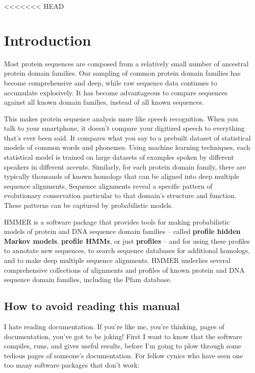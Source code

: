 <<<<<<< HEAD
\newpage
\chapter{Introduction}
\label{chapter:introduction}
\setcounter{footnote}{0}

Most protein sequences are composed from a relatively small number of
ancestral protein domain families. Our sampling of common protein
domain families has become comprehensive and deep, while raw sequence
data continues to accumulate explosively. It has become advantageous
to compare sequences against all known domain families, instead of all
known sequences.

This makes protein sequence analysis more like speech recognition.
When you talk to your smartphone, it doesn't compare your digitized
speech to everything that's ever been said. It compares what you say
to a prebuilt dataset of statistical models of common words and
phonemes.  Using machine learning techniques, each statistical model
is trained on large datasets of examples spoken by different speakers
in different accents. Similarly, for each protein domain family, there
are typically thousands of known homologs that can be aligned into
deep multiple sequence alignments. Sequence alignments reveal a
specific pattern of evolutionary conservation particular to that
domain's structure and function. These patterns can be captured by
probabilistic models.

HMMER is a software package that provides tools for making
probabilistic models of protein and DNA sequence domain families --
called \textbf{profile hidden Markov models}, \textbf{profile HMMs},
or just \textbf{profiles} -- and for using these profiles to annotate
new sequences, to search sequence databases for additional homologs,
and to make deep multiple sequence alignments.  HMMER underlies
several comprehensive collections of alignments and profiles of known
protein and DNA sequence domain families, including the Pfam
database.


\section{How to avoid reading this manual}

I hate reading documentation. If you're like me, you're thinking,
\pageref*{manualend} pages of documentation, you've got to be joking!
First I want to know that the software compiles, runs, and gives
useful results, before I'm going to plow through some
\pageref*{manualend} tedious pages of someone's documentation. For
fellow cynics who have seen one too many software packages that don't
work:

